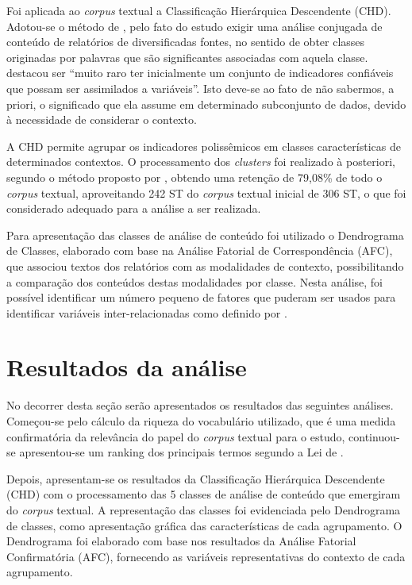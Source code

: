 \documentclass{textolivre}
\begin{document}
Foi aplicada ao \textit{corpus} textual a Classificação Hierárquica Descendente (CHD). Adotou-se o método de \textcite{reinert1990}, pelo fato do estudo exigir uma análise conjugada de conteúdo de relatórios de diversificadas fontes, no sentido de obter classes originadas por palavras que são significantes associadas com aquela classe. \textcite[p. 187]{reinert1983} destacou ser “muito raro ter inicialmente um conjunto de indicadores confiáveis que possam ser assimilados a variáveis”. Isto deve-se ao fato de não sabermos, a priori, o significado que ela assume em determinado subconjunto de dados, devido à necessidade de considerar o contexto.

A CHD permite agrupar os indicadores polissêmicos em classes características de determinados contextos. O processamento dos \textit{clusters} foi realizado à posteriori, segundo o método proposto por \textcite{reinert1990}, obtendo uma retenção de 79,08\% de todo o \textit{corpus} textual, aproveitando 242 ST do \textit{corpus} textual inicial de 306 ST, o que foi considerado adequado para a análise a ser realizada.

Para apresentação das classes de análise de conteúdo foi utilizado o Dendrograma de Classes, elaborado com base na Análise Fatorial de Correspondência (AFC), que associou textos dos relatórios com as modalidades de contexto, possibilitando a comparação dos conteúdos destas modalidades por classe. Nesta análise, foi possível identificar um número pequeno de fatores que puderam ser usados para identificar variáveis inter-relacionadas como definido por \textcite{lebart1994}.

\section{Resultados da análise}\label{sec-resultados}
No decorrer desta seção serão apresentados os resultados das seguintes análises. Começou-se pelo cálculo da riqueza do vocabulário utilizado, que é uma medida confirmatória da relevância do papel do \textit{corpus} textual para o estudo, continuou-se apresentou-se um ranking dos principais termos segundo a Lei de \textcite{zipf1949}.

Depois, apresentam-se os resultados da Classificação Hierárquica Descendente (CHD) com o processamento das 5 classes de análise de conteúdo que emergiram do \textit{corpus} textual. A representação das classes foi evidenciada pelo Dendrograma de classes, como apresentação gráfica das características de cada agrupamento. O Dendrograma foi elaborado com base nos resultados da Análise Fatorial Confirmatória (AFC), fornecendo as variáveis representativas do contexto de cada agrupamento.
\end{document}
